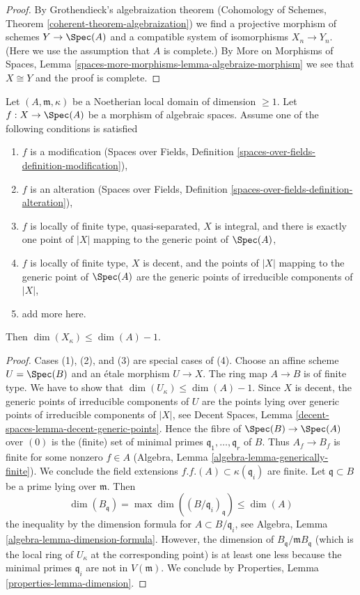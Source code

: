 \begin{proof}
\medskip\noindent
By Grothendieck's algebraization theorem
(Cohomology of Schemes, Theorem \ref{coherent-theorem-algebraization})
we find a projective morphism of schemes $Y \to \Spec(A)$ and a compatible
system of isomorphisms $X_n \to Y_n$. (Here we use the assumption
that $A$ is complete.) By
More on Morphisms of Spaces, Lemma
\ref{spaces-more-morphisms-lemma-algebraize-morphism}
we see that $X \cong Y$ and the proof is complete.
\end{proof}

\begin{lemma}
\label{lemma-dimension-special-fibre}
Let $(A, \mathfrak m, \kappa)$ be a Noetherian local domain
of dimension $\geq 1$.
Let $f : X \to \Spec(A)$ be a morphism of algebraic spaces.
Assume one of the following conditions is satisfied
\begin{enumerate}
\item $f$ is a modification (Spaces over Fields, Definition
\ref{spaces-over-fields-definition-modification}),
\item $f$ is an alteration (Spaces over Fields, Definition
\ref{spaces-over-fields-definition-alteration}),
\item $f$ is locally of finite type, quasi-separated, $X$ is integral,
and there is exactly one point of $|X|$ mapping to the generic point
of $\Spec(A)$,
\item $f$ is locally of finite type, $X$ is decent, and the points
of $|X|$ mapping to the generic point of $\Spec(A)$ are
the generic points of irreducible components of $|X|$,
\item add more here.
\end{enumerate}
Then $\dim(X_\kappa) \leq \dim(A) - 1$.
\end{lemma}

\begin{proof}
Cases (1), (2), and (3) are special cases of (4). Choose an affine scheme
$U = \Spec(B)$ and an \'etale morphism $U \to X$. The ring map $A \to B$
is of finite type. We have to show that
$\dim(U_\kappa) \leq \dim(A) - 1$. Since $X$ is decent, the generic
points of irreducible components of $U$ are the points lying over
generic points of irreducible components of $|X|$, see
Decent Spaces, Lemma \ref{decent-spaces-lemma-decent-generic-points}.
Hence the fibre of $\Spec(B) \to \Spec(A)$ over $(0)$
is the (finite) set of minimal primes $\mathfrak q_1, \ldots, \mathfrak q_r$
of $B$. Thus $A_f \to B_f$ is finite for some nonzero $f \in A$
(Algebra, Lemma \ref{algebra-lemma-generically-finite}).
We conclude the field extensions $f.f.(A) \subset \kappa(\mathfrak q_i)$
are finite. Let $\mathfrak q \subset B$ be a prime lying over $\mathfrak m$.
Then
$$
\dim(B_\mathfrak q) = \max \dim((B/\mathfrak q_i)_{\mathfrak q})
\leq \dim(A)
$$
the inequality by the dimension formula for $A \subset B/\mathfrak q_i$, see
Algebra, Lemma \ref{algebra-lemma-dimension-formula}.
However, the dimension of $B_\mathfrak q/\mathfrak m B_\mathfrak q$
(which is the local ring of $U_\kappa$ at the corresponding point)
is at least one less because the minimal primes $\mathfrak q_i$
are not in $V(\mathfrak m)$. We conclude by
Properties, Lemma \ref{properties-lemma-dimension}.
\end{proof}

